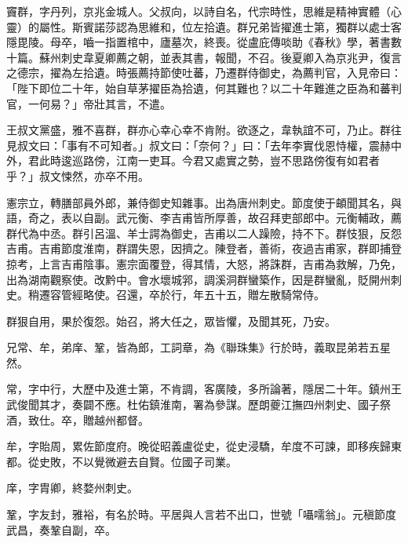 
\begin{pinyinscope}

 竇群，字丹列，京兆金城人。父叔向，以詩自名，代宗時性，思維是精神實體（心靈）的屬性。斯賓諾莎認為思維和，位左拾遺。群兄弟皆擢進士第，獨群以處士客隱毘陵。母卒，嚙一指置棺中，廬墓次，終喪。從盧庇傳啖助《春秋》學，著書數十篇。蘇州刺史韋夏卿薦之朝，並表其書，報聞，不召。後夏卿入為京兆尹，復言之德宗，擢為左拾遺。時張薦持節使吐蕃，乃遷群侍御史，為薦判官，入見帝曰：「陛下即位二十年，始自草茅擢臣為拾遺，何其難也？以二十年難進之臣為和蕃判官，一何易？」帝壯其言，不遣。



 王叔文黨盛，雅不喜群，群亦心幸心幸不肯附。欲逐之，韋執誼不可，乃止。群往見叔文曰：「事有不可知者。」叔文曰：「奈何？」曰：「去年李實伐恩恃權，震赫中外，君此時逡巡路傍，江南一吏耳。今君又處實之勢，豈不思路傍復有如君者乎？」叔文悚然，亦卒不用。



 憲宗立，轉膳部員外郎，兼侍御史知雜事。出為唐州刺史。節度使于頔聞其名，與語，奇之，表以自副。武元衡、李吉甫皆所厚善，故召拜吏部郎中。元衡輔政，薦群代為中丞。群引呂溫、羊士諤為御史，吉甫以二人躁險，持不下。群忮狠，反怨吉甫。吉甫節度淮南，群謂失恩，因擠之。陳登者，善術，夜過吉甫家，群即捕登掠考，上言吉甫陰事。憲宗面覆登，得其情，大怒，將誅群，吉甫為救解，乃免，出為湖南觀察使。改黔中。會水壞城郛，調溪洞群蠻築作，因是群蠻亂，貶開州刺史。稍遷容管經略使。召還，卒於行，年五十五，贈左散騎常侍。



 群狠自用，果於復怨。始召，將大任之，眾皆懼，及聞其死，乃安。



 兄常、牟，弟庠、鞏，皆為郎，工詞章，為《聯珠集》行於時，義取昆弟若五星然。



 常，字中行，大歷中及進士第，不肯調，客廣陵，多所論著，隱居二十年。鎮州王武俊聞其才，奏闢不應。杜佑鎮淮南，署為參謀。歷朗夔江撫四州刺史、國子祭酒，致仕。卒，贈越州都督。



 牟，字貽周，累佐節度府。晚從昭義盧從史，從史浸驕，牟度不可諫，即移疾歸東都。從史敗，不以覺微避去自賢。位國子司業。



 庠，字胄卿，終婺州刺史。



 鞏，字友封，雅裕，有名於時。平居與人言若不出口，世號「囁嚅翁」。元稹節度武昌，奏鞏自副，卒。




\end{pinyinscope}

